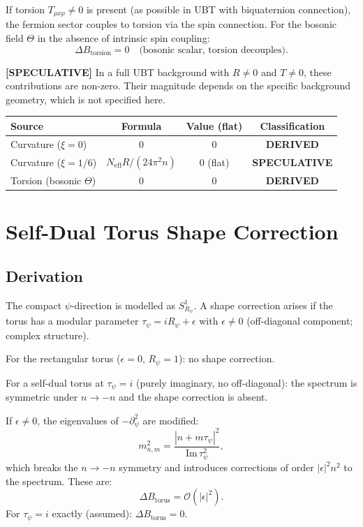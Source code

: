\documentclass[11pt,a4paper]{article}
\newcommand{\speculative}[1]{\textbf{[SPECULATIVE]} #1}
\begin{document}
If torsion $T_{\mu\nu\rho} \neq 0$ is present (as possible in UBT with biquaternion
connection), the fermion sector couples to torsion via the spin connection.  For the
bosonic field $\Theta$ in the absence of intrinsic spin coupling:
\begin{equation}
  \Delta B_\mathrm{torsion} = 0 \quad \text{(bosonic scalar, torsion decouples)}.
\end{equation}

\speculative{In a full UBT background with $R \neq 0$ and $T \neq 0$, these
contributions are non-zero.  Their magnitude depends on the specific background
geometry, which is not specified here.}

\begin{center}
\begin{tabular}{lccc}
\toprule
Source & Formula & Value (flat) & Classification \\\midrule
Curvature ($\xi=0$) & $0$ & $0$ & \textbf{DERIVED} \\
Curvature ($\xi=1/6$) & $N_\mathrm{eff} R/(24\pi^2 n)$ & $0$ (flat) & \textbf{SPECULATIVE} \\
Torsion (bosonic $\Theta$) & $0$ & $0$ & \textbf{DERIVED} \\\bottomrule
\end{tabular}
\end{center}

\section{Self-Dual Torus Shape Correction}

\subsection{Derivation}

The compact $\psi$-direction is modelled as $S^1_{R_\psi}$.  A shape correction
arises if the torus has a modular parameter $\tau_\psi = i R_\psi + \epsilon$
with $\epsilon \neq 0$ (off-diagonal component; complex structure).

For the rectangular torus ($\epsilon = 0$, $R_\psi = 1$): no shape correction.

For a self-dual torus at $\tau_\psi = i$ (purely imaginary, no off-diagonal):
the spectrum is symmetric under $n \to -n$ and the shape correction is absent.

If $\epsilon \neq 0$, the eigenvalues of $-\partial_\psi^2$ are modified:
\begin{equation}
  m_{n,m}^2 = \frac{|n + m\tau_\psi|^2}{\mathrm{Im}\,\tau_\psi^2},
\end{equation}
which breaks the $n \to -n$ symmetry and introduces corrections of order
$|\epsilon|^2 n^2$ to the spectrum.  These are:
\begin{equation}
  \Delta B_\mathrm{torus} = \mathcal{O}(|\epsilon|^2).
\end{equation}
For $\tau_\psi = i$ exactly (assumed): $\Delta B_\mathrm{torus} = 0$.
\end{document}
